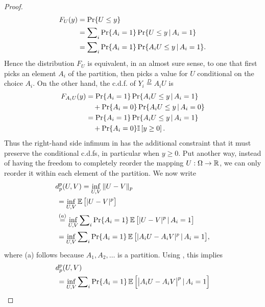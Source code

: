 \documentclass{article}
\def \Deq {\overset{D}{=}}
\begin{document}
\begin{proof}
\begin{align*}
F_U(y) &= \Pr \{ U \le y \} \\
&= \sum\nolimits_i \Pr \{ A_i = 1 \} \Pr \{ U \le y \, | \, A_i = 1 \} \\
&= \sum\nolimits_i \Pr \{ A_i = 1 \} \Pr \{ A_i U \le y \, | \, A_i = 1 \} .
\end{align*}
Hence the distribution $F_U$ is equivalent, in an almost sure sense, to one that first picks an element $A_i$ of the partition, then picks a value for $U$ conditional on the choice $A_i$. On the other hand, the c.d.f. of $Y_i \Deq A_i U$ is
\begin{align*}
F_{A_i U}(y) &= \Pr \{ A_i = 1 \} \Pr \{ A_i U \le y \, | \, A_i = 1 \} \\
&\hspace{1em} + \Pr \{ A_i = 0 \} \Pr \{ A_i U \le y \, | \, A_i = 0 \} \\
&= \Pr \{ A_i = 1 \} \Pr \{ A_i U \le y \, | \, A_i = 1 \} \\
&\hspace{1em} + \Pr \{ A_i = 0 \} \mathbb{I}\left [ y \ge 0 \right ] .
\end{align*}
Thus the right-hand side infimum in  has the additional constraint that it must preserve the conditional c.d.fs, in particular when $y \ge 0$.
Put another way, instead of having the freedom to completely reorder the mapping $U : \Omega \to \mathbb{R}$, we can only reorder it within each element of the partition. We now write
\begin{align*}
d^p_p(U, V) &= \inf_{U,V} \pnorm{U - V} \\
&\hspace{-3.5em} = \inf_{U, V} \expect \big [ \panorm{U - V} \big ] \\
&\hspace{-3.5em} \overset{(a)}{=} \inf_{U, V} \sum\nolimits_i \Pr \{ A_i = 1 \} \expect \big [ \panorm{U - V} \cbar A_i = 1 \big ] \\
&\hspace{-3.5em} = \inf_{U, V} \sum\nolimits_i \Pr \{ A_i = 1 \} \expect \big [ \panorm{A_i U - A_i V} \cbar A_i = 1 \big ],
\end{align*}
where (a) follows because $A_1, A_2, \dots$ is a partition. Using , this implies
\begin{align*}
d^p_p(U, V) & \\
&\hspace{-3.5em} = \inf_{U, V} \sum\nolimits_i \Pr\{A_i = 1\} \expect \Big [ \big | A_i U - A_i V \big |^p \cbar A_i = 1 \Big ] \\

\end{align*}
\end{proof}
\end{document}
